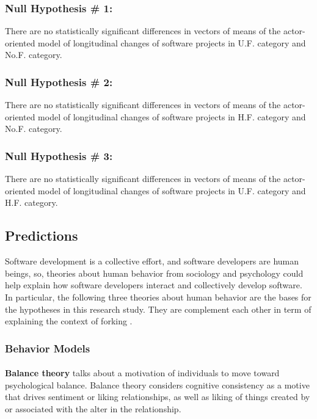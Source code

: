 \documentclass[11pt]{report}
\begin{document}
\subsubsection{Null Hypothesis \# 1:} 
There are no statistically significant differences in vectors of means of the actor-oriented model of longitudinal changes of software projects in U.F. category and No.F. category.

\subsubsection{Null Hypothesis \# 2:} 
There are no statistically significant differences in vectors of means of the actor-oriented model of longitudinal changes of software projects in H.F. category and No.F. category.

\subsubsection{Null Hypothesis \# 3:} 
There are no statistically significant differences in vectors of means of the actor-oriented model of longitudinal changes of software projects in U.F. category and H.F. category.


\subsection{Predictions}
Software development is a collective effort, and software developers are human beings, so, theories about human behavior from sociology and psychology could help explain how software developers interact and collectively develop software. In particular, the following three theories about human behavior are the bases for the hypotheses in this research study. They are complement each other in term of explaining the context of forking .

\subsubsection{Behavior Models}
\paragraph{} \textbf{Balance theory} \cite{Heider} talks about a motivation of individuals to move toward psychological balance. Balance theory considers cognitive consistency as a motive that drives sentiment or liking relationships, as well as liking of things created by or associated with the alter in the relationship.
\end{document}

